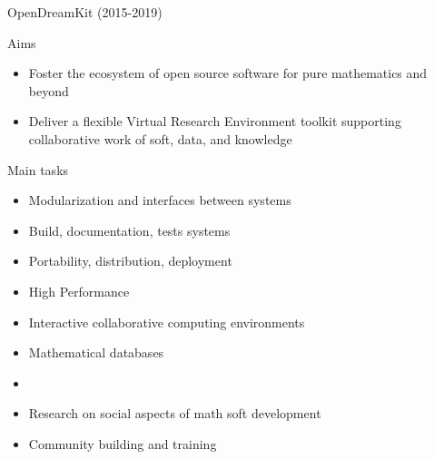 \documentclass[
  usenames,svgnames, %
  compress,
  ]{beamer}
\begin{document}
\begin{frame}{OpenDreamKit (2015-2019)}
  \begin{block}{Aims}
    \begin{itemize}
    \item Foster the ecosystem of open source software for pure
      mathematics and beyond
    \item Deliver a flexible Virtual Research Environment toolkit
      supporting collaborative work of soft, data, and knowledge
    \end{itemize}
  \end{block}

  \begin{block}{Main tasks}
    \begin{itemize}
    \item Modularization and interfaces between systems
    \item Build, documentation, tests systems
    \item Portability, distribution, deployment
    \item High Performance
    \item Interactive collaborative computing environments
    \item Mathematical databases
    \item %
    \item Research on social aspects of math soft development
    \item Community building and training
    \end{itemize}
  \end{block}
\end{frame}


\end{document}
